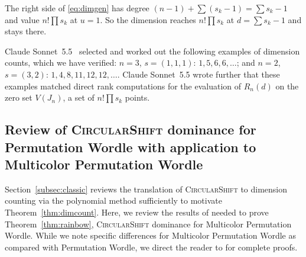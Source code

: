 \documentclass[12pt]{amsart}
\theoremstyle{definition}
\theoremstyle{remark}
\newcommand\classic{Permutation Wordle\xspace}
\newcommand\rainbow{Multicolor Permutation Wordle\xspace}
\newcommand\basicstrat{\mbox{\textnormal{\textsc{CircularShift}}}\xspace}
\newcommand\KSV{monthly-kutin-smithline-vatter}
\begin{document}
The right side of \eqref{eq:dimgen}
has degree $(n-1)+\sum(s_k-1)=\sum s_k-1$ and value $n!\prod s_k$ at
$u=1$. So the dimension reaches $n!\prod s_k$ at $d=\sum s_k-1$ and
stays there.

Claude Sonnet~5.5~\cite{claude-sonnet-2026-koszul} selected and worked out the
following examples of dimension counts, which we have verified:
$n=3$, $s=(1,1,1)$: $1,5,6,6,\dots$; and $n=2$, $s=(3,2)$: $1,4,8,11,12,12,\dots$.
Claude Sonnet~5.5 wrote further that these examples matched direct
rank computations for the evaluation of $R_n(d)$ on the zero set $V(J_n)$,
a set of $n!\prod s_k$ points.

\subsection{Review of \basicstrat dominance for \classic with application to \rainbow}\label{subsec:rainbow}

Section~\ref{subsec:classic} reviews the translation of \basicstrat to dimension
counting via the polynomial method sufficiently to motivate
Theorem~\ref{thm:dimcount}.  Here, we review the results of 
\cite{\KSV} needed to prove Theorem~\ref{thm:rainbow},
\basicstrat dominance for \rainbow.
While we note specific differences for \rainbow as compared with \classic, we
direct the reader to \cite{\KSV} for complete proofs.
\end{document}
